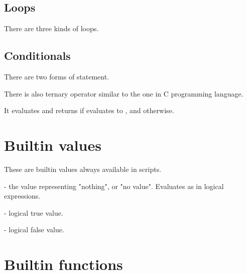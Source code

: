 \subsection{Loops}

There are three kinds of loops.





\subsection{Conditionals}

There are two forms of  statement.



There is also ternary operator similar to the one in C programming language.


It evaluates and returns  if  
evaluates to \true, and  otherwise.


\section{Builtin values}

These are builtin values always available in scripts.

 - the value representing "nothing", or "no value". 
Evaluates as  in logical expressions.

 - logical true value.

 - logical false value.


\section{Builtin functions}

